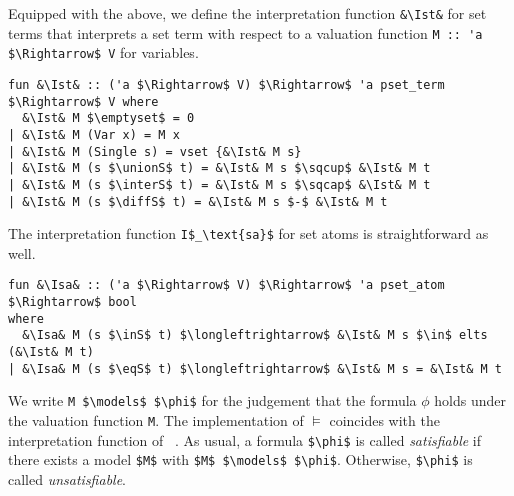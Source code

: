 \documentclass[sigplan,10pt,anonymous,review]{acmart}
\newcommand{\unionS}{\sqcup_\text{s}}
\newcommand{\interS}{\sqcap_\text{s}}
\newcommand{\diffS}{-_\text{s}}
\newcommand{\inS}{\in_\text{s}}
\newcommand{\eqS}{=_\text{s}}
\newcommand{\Ist}{I$_\text{st}$}
\newcommand{\Isa}{I$_\text{sa}$}
\begin{document}
Equipped with the above, we define the interpretation function \lstinline!&\Ist&! for set terms that interprets a set term with respect to a valuation function \lstinline!M :: 'a $\Rightarrow$ V! for variables.
\begin{lstlisting}
fun &\Ist& :: ('a $\Rightarrow$ V) $\Rightarrow$ 'a pset_term $\Rightarrow$ V where
  &\Ist& M $\emptyset$ = 0
| &\Ist& M (Var x) = M x
| &\Ist& M (Single s) = vset {&\Ist& M s}
| &\Ist& M (s $\unionS$ t) = &\Ist& M s $\sqcup$ &\Ist& M t 
| &\Ist& M (s $\interS$ t) = &\Ist& M s $\sqcap$ &\Ist& M t 
| &\Ist& M (s $\diffS$ t) = &\Ist& M s $-$ &\Ist& M t 
\end{lstlisting}
The interpretation function \lstinline!I$_\text{sa}$! for set atoms is straightforward as well.
\begin{lstlisting}
fun &\Isa& :: ('a $\Rightarrow$ V) $\Rightarrow$ 'a pset_atom $\Rightarrow$ bool
where
  &\Isa& M (s $\inS$ t) $\longleftrightarrow$ &\Ist& M s $\in$ elts (&\Ist& M t)
| &\Isa& M (s $\eqS$ t) $\longleftrightarrow$ &\Ist& M s = &\Ist& M t
\end{lstlisting}

We write \lstinline!M $\models$ $\phi$! for the judgement that the formula $\phi$ holds under the valuation function \lstinline!M!.
The implementation of $\models$ coincides with the interpretation function of \citeauthor{lqe}~\cite{lqe}.
As usual, a formula \lstinline!$\phi$! is called \textit{satisfiable} if there exists a model \lstinline!$M$! with \lstinline!$M$ $\models$ $\phi$!.
Otherwise, \lstinline!$\phi$! is called \textit{unsatisfiable}.
\end{document}
